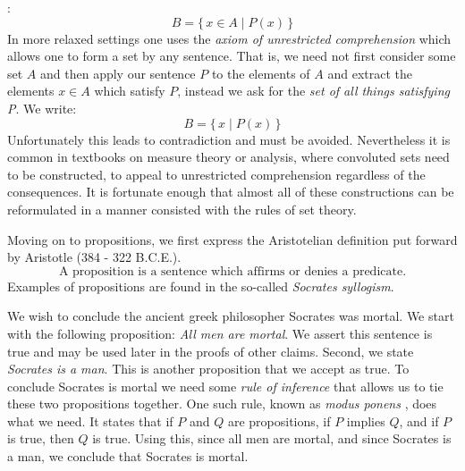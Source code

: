             :
            \begin{equation}
                B=\{\,x\in{A}\;|\;P(x)\,\}
            \end{equation}
            In more relaxed settings one uses the \textit{axiom of unrestricted}
            \textit{comprehension} which
            allows one to form a set by any sentence. That is, we need not first
            consider some set $A$ and then apply our sentence $P$ to the elements of
            $A$ and extract the elements $x\in{A}$ which satisfy $P$, instead we
            ask for the \textit{set of all things satisfying P}. We write:
            \begin{equation}
                B=\{\,x\;|\;P(x)\,\}
            \end{equation}
            Unfortunately this leads to contradiction and must be avoided.
            Nevertheless it is common in textbooks on measure theory or
            analysis, where convoluted sets need to be constructed, to appeal
            to unrestricted comprehension regardless of the consequences. It is
            fortunate enough that almost all of these constructions can be
            reformulated in a manner consisted with the rules of set theory.
            \par\hfill\par
            Moving on to propositions, we first express the Aristotelian
            definition put forward by Aristotle
            (384 - 322 B.C.E.).
            \begin{equation}
                \text{A proposition is a sentence which affirms or denies a }
                \text{predicate.}
            \end{equation}
            Examples of propositions are found in the so-called
            \textit{Socrates syllogism}.
            \begin{example}
                We wish to conclude the ancient greek philosopher
                Socrates was mortal. We start with the
                following proposition: \textit{All men are mortal}. We assert
                this sentence is true and may be used later in the proofs of
                other claims. Second, we state \textit{Socrates is a man}.
                This is another proposition that we accept as true. To conclude
                Socrates is mortal we need some \textit{rule of inference} that
                allows us to tie these two propositions together. One such
                rule, known as \textit{modus ponens}%
                , does what we need. It states
                that if $P$ and $Q$ are propositions, if $P$ implies $Q$, and
                if $P$ is true, then $Q$ is true. Using this, since all men are
                mortal, and since Socrates is a man, we conclude that Socrates
                is mortal.
            \end{example}
